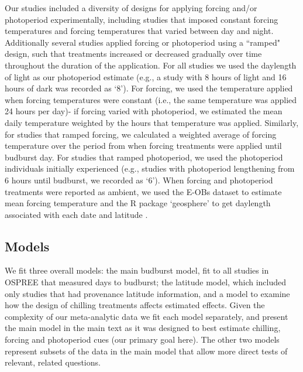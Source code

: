 \documentclass{article}
\begin{document}
Our studies included a diversity of designs for applying forcing and/or photoperiod experimentally, including studies that imposed constant forcing temperatures and forcing temperatures that varied between day and night.  Additionally several studies applied forcing or photoperiod using a ``ramped" design, such that treatments increased or decreased gradually over time throughout the duration of the application. For all studies we used the daylength of light as our photoperiod estimate (e.g., a study with 8 hours of light and 16 hours of dark was recorded as `8'). For forcing, we used the temperature applied when forcing temperatures were constant (i.e., the same temperature was applied 24 hours per day)- if forcing varied with photoperiod, we estimated the mean daily temperature weighted by the hours that temperature was applied. Similarly, for studies that ramped forcing, we calculated a weighted average of forcing temperature over the period from when forcing treatments were applied until budburst day. For studies that ramped photoperiod, we used the photoperiod individuals initially experienced (e.g., studies with photoperiod lengthening from 6 hours until budburst, we recorded as `6'). When forcing and photoperiod treatments were reported as ambient, we used the E-OBs dataset to estimate mean forcing temperature and the R package `geosphere’ to get daylength associated with each  date and latitude \citep{cornes2018}. 

\subsection*{Models}

\par We fit three overall models: the main budburst model, fit to all studies in OSPREE that measured days to budburst; the latitude model, which included only studies that had provenance latitude information, and a model to examine how the design of chilling treatments affects estimated effects. Given the complexity of our meta-analytic data we fit each model separately, and present the main model in the main text as it was designed to best estimate chilling, forcing and photoperiod cues (our primary goal here). The other two models represent subsets of the data in the main model that allow more direct tests of relevant, related questions. 
\end{document}
